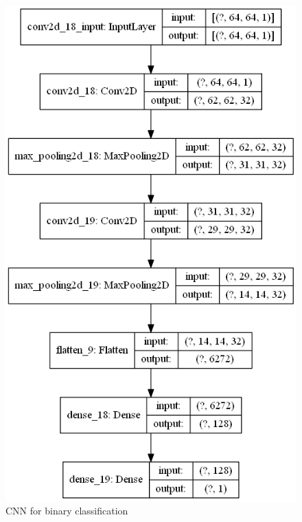 \documentclass{article}
\begin{document}
\begin{figure}
   \centering
    \includegraphics[totalheight=8cm]{circle_id/binary/model.png}
  \caption{\label{fig:binary_model} CNN for binary classification}
\end{figure}
%
\end{document}
